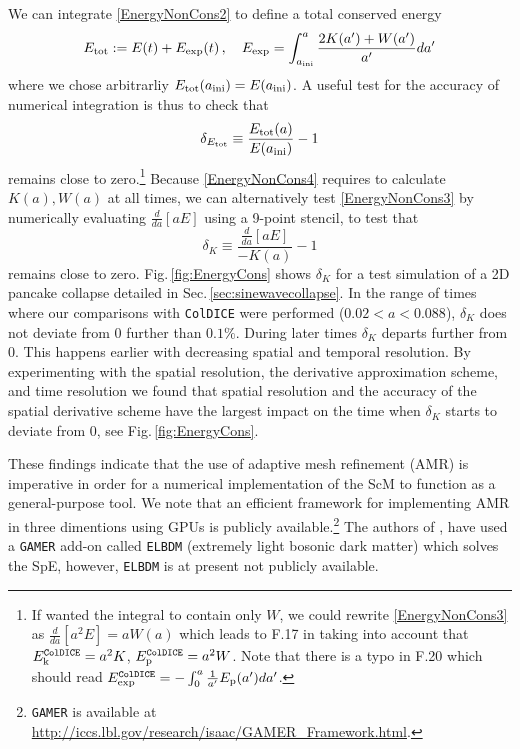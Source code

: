 \documentclass[twocolumn, nofootinbib, showpacs, superscriptaddress]{revtex4-1}
\begin{document}
We can integrate \eqref{EnergyNonCons2} to define a total conserved energy 
\begin{equation}
E_{\rm tot} := E(t) + E_{\rm exp}(t) \,, \quad E_{\rm exp} =  \int_{a_{\rm ini}}^a \frac{ 2 K(a') + W(a')}{a'} d a'  \label{EnergyNonCons4}
\end{equation}
 where we chose arbitrarliy $E_{\rm tot}(a_{\rm ini})=E(a_{\rm ini})$. 
 A useful test for the accuracy of numerical integration is thus to  check that 
 \begin{equation} \label{EnergyNonCons6}
 \delta_{E_{\rm tot}} \equiv \frac{E_{\rm tot}(a)}{E(a_{\rm ini})} -1
 \end{equation}
  remains close to zero.\footnote{If wanted the integral to contain only $W$, we could rewrite \eqref{EnergyNonCons3} as $\frac{d}{da}\left[ a^2 E \right] =aW(a)$  which leads to F.17 in \cite{SousbieColombi2016} taking into account that $E^{\texttt{ColDICE}}_{\rm k} = a^2 K$, $E^{\texttt{ColDICE}}_{\rm p} = a^2 W$. Note that there is a typo in F.20 which should read $E^{\texttt{ColDICE}}_{\rm exp} = - \int_0^a\frac{1}{a'} E_{\rm p}(a')da'$.}
Because \eqref{EnergyNonCons4} requires to calculate $K(a), W(a)$ at all times, we can alternatively test \eqref{EnergyNonCons3} 
by numerically evaluating $\frac{d}{da}\left[ a E \right]$ using a 9-point stencil, to test that
\begin{equation}
\delta_K\equiv\frac{\frac{d}{da}\left[ a E \right]}{ -K(a)} -1 \label{EnergyNonCons5}
\end{equation}
remains close to zero. 
Fig.\,\ref{fig:EnergyCons} shows $\delta_K$ for a test simulation of a 2D pancake collapse detailed in Sec.\,\ref{sec:sinewavecollapse}. 
In the range of times where our comparisons with \texttt{ColDICE} were performed ($0.02< a<0.088$), $\delta_K$ does not deviate from 0 further than $0.1\%$.
     During later times $\delta_K$ departs further from 0. This happens earlier with decreasing spatial and temporal resolution.
     By experimenting with the spatial resolution, the derivative approximation scheme, and time resolution we found 
that spatial resolution and the accuracy of the spatial derivative scheme have the largest impact on the time 
when $\delta_K$ starts to deviate from 0, see Fig.\,\ref{fig:EnergyCons}.

These findings indicate that the use of  adaptive mesh refinement (AMR) is imperative in order for a numerical implementation of the ScM 
to function as a general-purpose tool. 
We note that an efficient framework for implementing AMR in three dimentions using GPUs is publicly available.\footnote{\texttt{GAMER} is available at \url{http://iccs.lbl.gov/research/isaac/GAMER_Framework.html}.} The authors of \cite{SchiveChiuehBroadhurst2014}, have used a \texttt{GAMER}
add-on  called \texttt{ELBDM} (extremely light bosonic dark matter) which solves the SpE, however, \texttt{ELBDM} is  at present
not publicly available.
\end{document}
